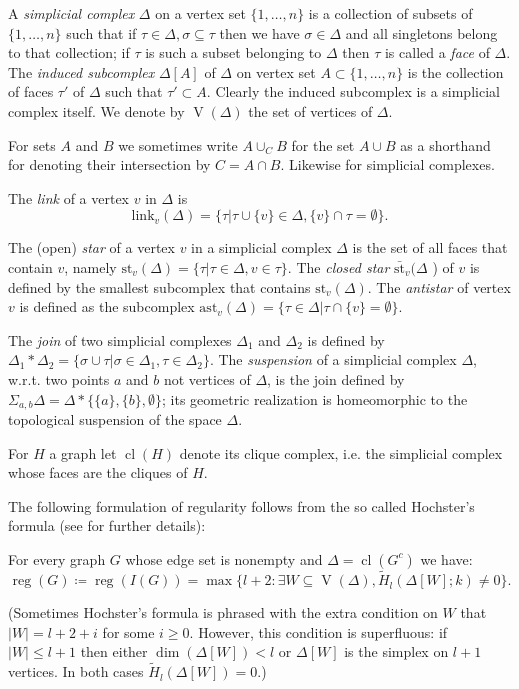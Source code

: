 \documentclass[ALCO,published]{cedram}
\numberwithin{equation}{section}
\newcommand \reg{\operatorname{reg}}
\newcommand \Vr{\operatorname{V}}
\newcommand \cl{\operatorname{cl}}
\newcommand \St{\text{st}}
\begin{document}
  A \emph{simplicial complex} $\Delta$ on a vertex set $\{1,\ldots, n\}$ is a collection of subsets of $\{1,\ldots ,n\}$ such that if $\tau \in \Delta, \sigma \subseteq \tau$ then we have $\sigma \in \Delta$ and all singletons belong to that collection; if $\tau$ is such a subset belonging to $\Delta$ then $\tau$ is called a \emph{face} of $\Delta$. 
 The \emph{induced subcomplex} $\Delta [A]$ of $\Delta$ on vertex set $A\subset \{1,\ldots,n\}$ is the collection of faces $\tau'$ of $\Delta$ such that $\tau' \subset A$. 
 Clearly the induced subcomplex is a simplicial complex itself. We denote by $\Vr(\Delta)$ the set of vertices of $\Delta$.

 For sets  $A$ and $B$ we sometimes write $A\cup_C B$ for the set $A\cup B$ as a shorthand for denoting their intersection by $C=A\cap B$. 
 Likewise for simplicial complexes.

 The \emph{link} of a vertex $v$ in $ \Delta$ is $$\text{link}_v (\Delta)= \{ \tau |\tau \cup \{v\} \in \Delta, \{v\} \cap \tau =\emptyset\}.$$

 The (open) \emph{star} of a vertex $v$ in a simplicial complex $\Delta$ is the set of all faces that contain $v$, namely $\St_v(\Delta)=\{\tau| \tau \in \Delta, v \in \tau\}$. The \emph{closed star} $\bar{\St}_v (\Delta$ ) of $v$ is defined by the smallest subcomplex that contains $\St_v(\Delta)$. The \emph{antistar} of vertex $v$ is defined as the subcomplex $\text{ast}_v (\Delta) = \{\tau \in \Delta| \tau \cap \{v\} = \emptyset\}$.


 The \emph{join} of two simplicial complexes $\Delta_1$ and $\Delta_2$ is defined by $\Delta_1 * \Delta_2=\{\sigma \cup \tau| \sigma \in \Delta_1, \tau \in \Delta_2\}$. 
 The \emph{suspension} of a simplicial complex $\Delta$, w.r.t. two points $a$ and $b$ not vertices of $\Delta$, is the join defined by $\Sigma_{a,b} \Delta=\Delta * \{\{a\},\{b\},\emptyset \}$; its geometric realization is homeomorphic to the topological suspension of the space $\Delta$.

  For $H$ a graph
  let $\cl(H)$ denote its clique complex, i.e. the simplicial complex whose faces are the cliques of $H$.

The following formulation of regularity follows from the so called Hochster's formula
(see {\cite{ms2005}} for further details):

\begin{theorem}
For every graph $G$ whose edge set is nonempty and $\Delta=\cl(G^c)$ we have:
$$\reg(G)\coloneqq\reg(I(G))= \max\{l+2:\exists W \subseteq \Vr(\Delta), \widetilde{H}_l(\Delta[W];k)\neq 0\}.$$
\end{theorem}
(Sometimes Hochster's formula is phrased with the extra condition on $W$ that $|W|=l+2+i$ for some $i\ge 0$. However, this condition is superfluous: if $|W|\le l+1$ then either $\dim(\Delta[W])<l$ or $\Delta[W]$ is the simplex on $l+1$ vertices. In both cases  $\widetilde{H}_l(\Delta[W])=0$.)
\end{document}
